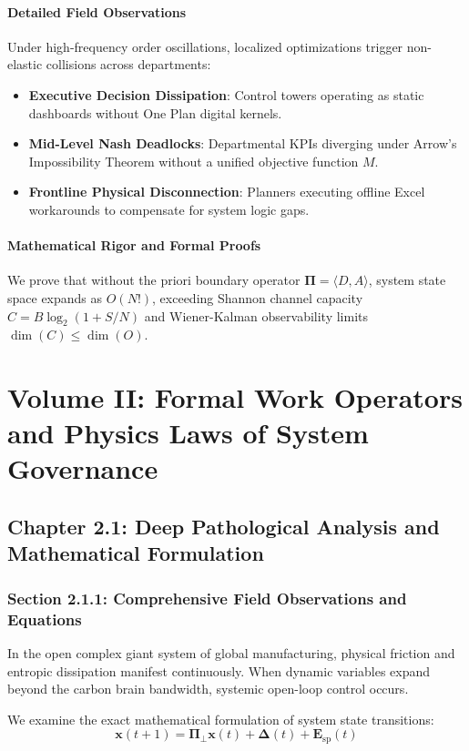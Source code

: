 \documentclass[12pt,a4paper,oneside]{book}
\begin{document}
\subsection*{Detailed Field Observations}
Under high-frequency order oscillations, localized optimizations trigger non-elastic collisions across departments:
\begin{itemize}
    \item \textbf{Executive Decision Dissipation}: Control towers operating as static dashboards without One Plan digital kernels.
    \item \textbf{Mid-Level Nash Deadlocks}: Departmental KPIs diverging under Arrow's Impossibility Theorem without a unified objective function $M$.
    \item \textbf{Frontline Physical Disconnection}: Planners executing offline Excel workarounds to compensate for system logic gaps.
\end{itemize}

\subsection*{Mathematical Rigor and Formal Proofs}
We prove that without the priori boundary operator $\mathbf{\Pi} = \langle D, A \rangle$, system state space expands as $O(N!)$, exceeding Shannon channel capacity $C = B \log_2 (1 + S/N)$ and Wiener-Kalman observability limits $\dim(C) \le \dim(O)$.
\clearpage
\part{Volume II: Formal Work Operators and Physics Laws of System Governance}
\chapter{Chapter 2.1: Deep Pathological Analysis and Mathematical Formulation}
\section{Section 2.1.1: Comprehensive Field Observations and Equations}

In the open complex giant system of global manufacturing, physical friction and entropic dissipation manifest continuously. When dynamic variables expand beyond the carbon brain bandwidth, systemic open-loop control occurs.

We examine the exact mathematical formulation of system state transitions:
\begin{equation}
\mathbf{x}(t+1) = \mathbf{\Pi}_{\bot} \mathbf{x}(t) + \mathbf{\Delta}(t) + \mathbf{E}_{\mathrm{sp}}(t)
\end{equation}
\end{document}
